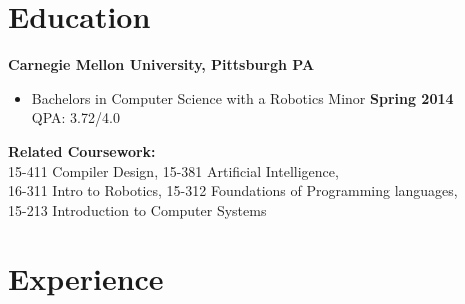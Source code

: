 \documentclass[sectioned]{dsyangres}
\begin{document}

\address{{\bf School Address} \\
  5032 Forbes Ave. SMC 4932 \\ Pittsburgh, PA 15289  \\
         }
\address{{\bf Home Address} \\
  5313 Betheny Circle \\
  Superior Township, MI 48198 \\
   }


\begin{resume}



\section{Education}

\textbf{Carnegie Mellon University, Pittsburgh PA}
  \begin{itemize}
    \item Bachelors in Computer Science with a Robotics Minor \hfill \textbf{ Spring 2014}
      \\ QPA: 3.72/4.0
  \end{itemize}
\textbf{Related Coursework:} \\
15-411 Compiler Design, 15-381 Artificial
Intelligence, \\
16-311 Intro to Robotics, 15-312 Foundations of Programming
languages,\\
15-213 Introduction to Computer Systems



\section{Experience}


\end{resume}
\end{document}

